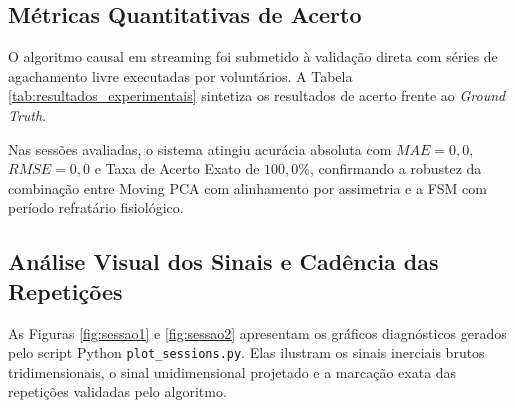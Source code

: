 \documentclass[12pt]{article}
\begin{document}
\subsection{Métricas Quantitativas de Acerto}

O algoritmo causal em streaming foi submetido à validação direta com séries de agachamento livre executadas por voluntários. A Tabela \ref{tab:resultados_experimentais} sintetiza os resultados de acerto frente ao \textit{Ground Truth}.

\begin{table}[ht]
\centering
\caption{Avaliação Experimental do Motor Streaming GymBeat em Agachamento Livre}
\label{tab:resultados_experimentais}
\small
{}
\end{table}

Nas sessões avaliadas, o sistema atingiu acurácia absoluta com $MAE = 0{,}0$, $RMSE = 0{,}0$ e Taxa de Acerto Exato de $100{,}0\%$, confirmando a robustez da combinação entre Moving PCA com alinhamento por assimetria e a FSM com período refratário fisiológico.

\subsection{Análise Visual dos Sinais e Cadência das Repetições}

As Figuras \ref{fig:sessao1} e \ref{fig:sessao2} apresentam os gráficos diagnósticos gerados pelo script Python \texttt{plot\_sessions.py}. Elas ilustram os sinais inerciais brutos tridimensionais, o sinal unidimensional projetado e a marcação exata das repetições validadas pelo algoritmo.
\end{document}

